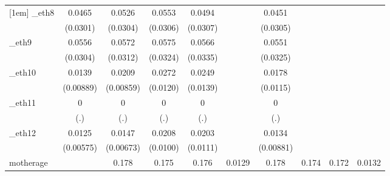 \begin{table}[htbp]
\begin{tabular}{l*{9}{c}}
[1em]
\_eth8       &      0.0465         &      0.0526\sym{*}  &      0.0553\sym{*}  &      0.0494         &                     &      0.0451         &                     &                     &                     \\
            &    (0.0301)         &    (0.0304)         &    (0.0306)         &    (0.0307)         &                     &    (0.0305)         &                     &                     &                     \\
[1em]
\_eth9       &      0.0556\sym{*}  &      0.0572\sym{*}  &      0.0575\sym{*}  &      0.0566\sym{*}  &                     &      0.0551\sym{*}  &                     &                     &                     \\
            &    (0.0304)         &    (0.0312)         &    (0.0324)         &    (0.0335)         &                     &    (0.0325)         &                     &                     &                     \\
[1em]
\_eth10      &      0.0139         &      0.0209\sym{**} &      0.0272\sym{**} &      0.0249\sym{*}  &                     &      0.0178         &                     &                     &                     \\
            &   (0.00889)         &   (0.00859)         &    (0.0120)         &    (0.0139)         &                     &    (0.0115)         &                     &                     &                     \\
[1em]
\_eth11      &           0         &           0         &           0         &           0         &                     &           0         &                     &                     &                     \\
            &         (.)         &         (.)         &         (.)         &         (.)         &                     &         (.)         &                     &                     &                     \\
[1em]
\_eth12      &      0.0125\sym{**} &      0.0147\sym{**} &      0.0208\sym{**} &      0.0203\sym{*}  &                     &      0.0134         &                     &                     &                     \\
            &   (0.00575)         &   (0.00673)         &    (0.0100)         &    (0.0111)         &                     &   (0.00881)         &                     &                     &                     \\
[1em]
motherage   &                     &       0.178\sym{*}  &       0.175\sym{*}  &       0.176\sym{*}  &      0.0129         &       0.178\sym{*}  &       0.174\sym{*}  &       0.172\sym{*}  &      0.0132         \\

\end{tabular}
\end{table}
